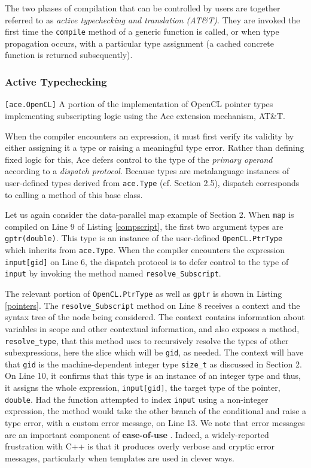 \documentclass[9pt,preprint]{sigplanconf}
\begin{document}
The two phases of compilation that can be controlled by users are together referred to as \emph{active typechecking and translation (AT\&T)}. They are invoked the first time the \verb|compile| method of a generic function is called, or when type propagation occurs, with a particular type assignment (a cached concrete function is returned subsequently).

\subsubsection{Active Typechecking}
\begin{codelisting}

\caption{\texttt{[ace.OpenCL]} A portion of the implementation of OpenCL pointer types implementing subscripting logic using the Ace extension mechanism, AT\&T.}
\label{pointers}
\end{codelisting}

When the compiler encounters an expression, it must first verify its validity by either assigning it a type or raising a meaningful type error. Rather than defining fixed logic for this, Ace defers control to the {type} of the \emph{primary operand} according to a {\em dispatch protocol}. Because types are metalanguage instances of user-defined types derived from \verb|ace.Type| (cf. Section 2.5), dispatch corresponds to calling a method of this base class.

Let us again consider the data-parallel map example of Section 2. When \verb|map| is compiled on Line 9 of Listing \ref{compscript}, the first two argument types are \verb|gptr(double)|. This type is an instance of the user-defined \verb|OpenCL.PtrType| which inherits from \verb|ace.Type|. When the compiler encounters the expression \verb|input[gid]| on Line 6, the dispatch protocol is to defer control to the type of \verb|input| by invoking the method named \verb|resolve_Subscript|.

The relevant portion of \verb|OpenCL.PtrType| as well as \verb|gptr| is shown in Listing \ref{pointers}. The \verb|resolve_Subscript| method on Line 8 receives a context and the syntax tree of the node being considered. The context contains information about variables in scope and other contextual information, and also exposes a method, \verb|resolve_type|, that this method uses to recursively resolve the types of other subexpressions, here the slice which will be \verb|gid|, as needed. The context will have that \verb|gid| is the machine-dependent integer type \verb|size_t| as discussed in Section 2. On Line 10, it confirms that this type is an instance of an integer type and thus, it assigns the whole expression, \verb|input[gid]|, the target type of the pointer, \verb|double|. Had the function attempted to index \verb|input| using a non-integer expression, the method would take the other branch of the conditional and raise a type error, with a custom error message, on Line 13. We note that error messages are an important component of \textbf{ease-of-use} \cite{marceau2011measuring}. Indeed, a widely-reported frustration with C++ is that it produces overly verbose and cryptic error messages, particularly when templates are used in clever ways.
\end{document}
